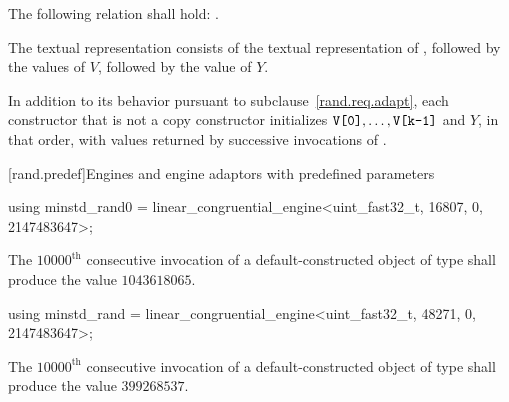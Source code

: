 \pnum
The following relation shall hold:
  .

\pnum
The textual representation%
%
consists of
 the textual representation of ,
followed by
 the  values of $V$,
followed by
 the value of $Y$.

\pnum
In addition to its behavior
pursuant to subclause~\ref{rand.req.adapt},
each constructor%
that is not a copy constructor
initializes $\texttt{V[0]}, \dotsc, \texttt{V[k-1]}$ and $Y$,
in that order,
with values returned by successive invocations of .%




[rand.predef]{Engines and engine adaptors with predefined parameters}%
%
%

%
%
\begin{itemdecl}
using minstd_rand0 =
      linear_congruential_engine<uint_fast32_t, 16807, 0, 2147483647>;
\end{itemdecl}

\begin{itemdescr}
\pnum\required
 The $10000^\text{th}$ consecutive invocation
 of a default-constructed object
 of type 
 shall produce the value $1043618065$.
\end{itemdescr}

%
%
\begin{itemdecl}
using minstd_rand =
      linear_congruential_engine<uint_fast32_t, 48271, 0, 2147483647>;
\end{itemdecl}

\begin{itemdescr}
\pnum\required
 The $10000^\text{th}$ consecutive invocation
 of a default-constructed object
 of type 
 shall produce the value $399268537$.
\end{itemdescr}


